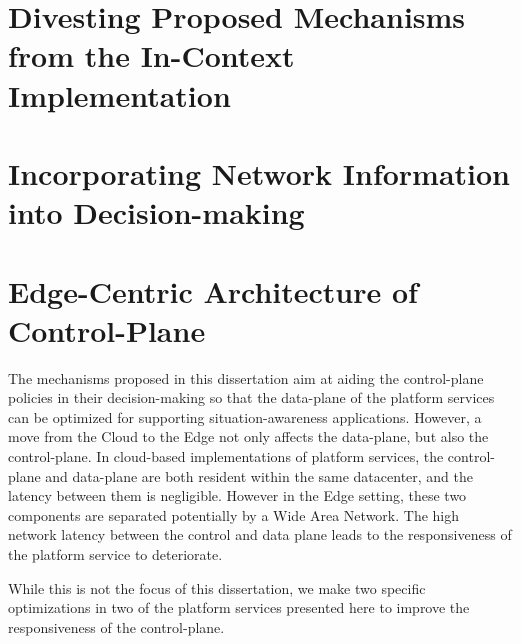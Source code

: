 \section{Divesting Proposed Mechanisms from the In-Context Implementation}

\section{Incorporating Network Information into Decision-making}

\section{Edge-Centric Architecture of Control-Plane}

The mechanisms proposed in this dissertation aim at aiding the control-plane policies in their decision-making so that the data-plane of the platform services can be optimized for supporting situation-awareness applications. However, a move from the Cloud to the Edge not only affects the data-plane, but also the control-plane. In cloud-based implementations of platform services, the control-plane and data-plane are both resident within the same datacenter, and the latency between them is negligible. However in the Edge setting, these two components are separated potentially by a Wide Area Network. The high network latency between the control and data plane leads to the responsiveness of the platform service to deteriorate.
\par While this is not the focus of this dissertation, we make two specific optimizations in two of the platform services presented here to improve the responsiveness of the control-plane. 

